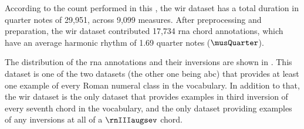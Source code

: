 
According to the count performed in this \thesisdiss{}, the
\gls{wir} dataset has a total duration in quarter notes of
29,951, across 9,099 measures. After preprocessing and
preparation, the \gls{wir} dataset contributed 17,734
\gls{rna} chord annotations, which have an average harmonic
rhythm of 1.69 quarter notes ($\musQuarter$).

The distribution of the \gls{rna} annotations and their
inversions are shown in . This
dataset is one of the two datasets (the other one being
\gls{abc}) that provides at least one example of every Roman
numeral class in the vocabulary. In addition to that, the
\gls{wir} dataset is the only dataset that provides examples
in third inversion of every seventh chord in the vocabulary,
and the only dataset providing examples of any inversions at
all of a $\rnIIIaugsev$ chord.


